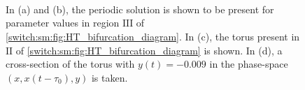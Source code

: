 \begin{figure}[ht!]
\centering
{} \\
 \\[0.2cm]
 \\
\caption{In \textup{(a)} and \textup{(b)}, the periodic solution is shown to be present for parameter values in region $\text{III}$ of  \cref{switch:sm:fig:HT_bifurcation_diagram}. In \textup{(c)}, the torus present in $\text{II}$ of  \cref{switch:sm:fig:HT_bifurcation_diagram} is shown. In \textup{(d)}, a cross-section of the torus with $y(t)=-0.009$ in the phase-space $(x,x(t-\tau_0),y)$ is taken.}
\end{figure}
